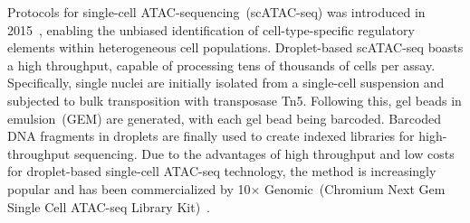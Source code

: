 Protocols for single-cell ATAC-sequencing~(scATAC-seq) was introduced in 2015~\citep{Buenrostro2015,cusanovich2015multiplex}, enabling the unbiased identification of cell-type-specific regulatory elements within heterogeneous cell populations. Droplet-based scATAC-seq boasts a high throughput, capable of processing tens of thousands of cells per assay. Specifically, single nuclei are initially isolated from a single-cell suspension and subjected to bulk transposition with transposase Tn5. Following this, gel beads in emulsion~(GEM) are generated, with each gel bead being barcoded. Barcoded DNA fragments in droplets are finally used to create indexed libraries for high-throughput sequencing. Due to the advantages of high throughput and low costs for droplet-based single-cell ATAC-seq technology, the method is increasingly popular and has been commercialized by 10$\times$ Genomic~(Chromium Next Gem Single Cell ATAC-seq Library Kit)~\citep{satpathy2019massively}.



